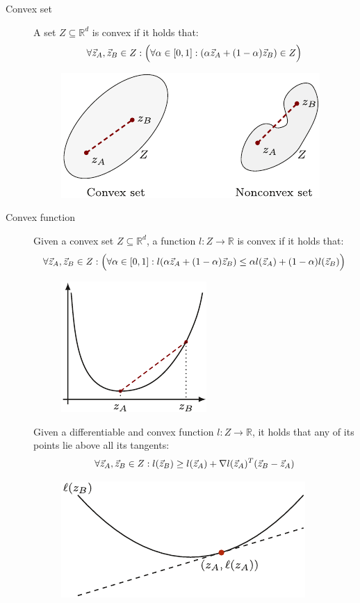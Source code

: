 \begin{description}
    \item[Convex set] 
        A set $Z \subseteq \mathbb{R}^d$ is convex if it holds that:
        \[
            \forall {\vec{z}}_A, {\vec{z}}_B \in Z: \Big( \forall \alpha \in [0, 1]: (\alpha {\vec{z}}_A + (1-\alpha){\vec{z}}_B) \in Z \Big)
        \]

        \begin{figure}[H]
            \centering
            \includegraphics[width=0.4\linewidth]{img/_convex_set.pdf}
        \end{figure}

    \item[Convex function] 
        Given a convex set $Z \subseteq \mathbb{R}^d$, a function $l: Z \rightarrow \mathbb{R}$ is convex if it holds that:
        \[
            \forall {\vec{z}}_A, {\vec{z}}_B \in Z: \Big( \forall \alpha \in [0, 1]: l(\alpha {\vec{z}}_A + (1-\alpha) {\vec{z}}_B) \leq \alpha l({\vec{z}}_A) + (1-\alpha) l({\vec{z}}_B) \Big)
        \]

        \begin{figure}[H]
            \centering
            \includegraphics[width=0.25\linewidth]{img/_convex_function.pdf}
        \end{figure}

        \begin{remark}
            Given a differentiable and convex function $l: Z \rightarrow \mathbb{R}$, it holds that any of its points lie above all its tangents:
            \[ \forall {\vec{z}}_A, {\vec{z}}_B \in Z: l({\vec{z}}_B) \geq l({\vec{z}}_A) + \nabla l({\vec{z}}_A)^T ({\vec{z}}_B - {\vec{z}}_A) \]

            \begin{figure}[H]
                \centering
                \includegraphics[width=0.3\linewidth]{img/_convex_tangent.pdf}
            \end{figure}
        \end{remark}


\end{description}
